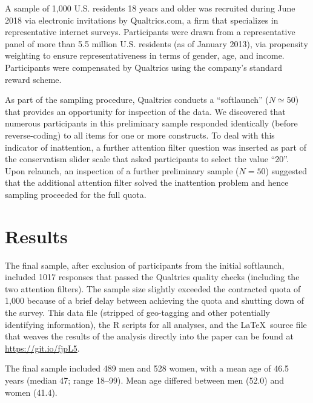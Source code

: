\documentclass[fignum,man]{apa}\usepackage[]{graphicx}\usepackage[]{color}
\begin{document}
A sample of 1,000 U.S. residents 18 years and older was recruited during June 2018
via electronic invitations by Qualtrics.com, a firm that
specializes in representative internet surveys. 
Participants were
drawn from a representative panel of more than 5.5 million
U.S. residents (as of January 2013), via propensity weighting to
ensure representativeness in terms of gender, age, and income.
Participants were compensated by Qualtrics using the company's
standard reward scheme.

As part of the sampling procedure, Qualtrics conducts a
``softlaunch'' ($N \simeq 50$) that provides an opportunity for
inspection of the data. We discovered that numerous participants 
in this preliminary sample 
responded identically (before reverse-coding)
to all items for one or more constructs. 
To deal with this indicator
of inattention, a further attention filter question was
inserted as part of the conservatism slider scale that asked
participants to select the value ``20''. Upon relaunch, 
an inspection of a further preliminary sample ($N=50$) suggested
that the additional attention filter
solved the inattention problem and hence sampling proceeded
for the full quota.

\section{Results}
The final sample, after exclusion of participants from 
the initial softlaunch, included 1017 responses that passed the Qualtrics
quality checks (including the two attention filters). The sample size
slightly exceeded the contracted quota of 1,000 because of a brief delay
between achieving the quota and shutting down of the survey.
This data file (stripped of geo-tagging and other potentially identifying 
information), 
the R scripts for all analyses, and the \LaTeX ~source file 
that weaves the results of the analysis directly into the paper can be found 
at \url{https://git.io/fjpL5}. 

The final sample included 489 men and 528 women, with a mean age of 
46.5 years
 (median 47;
range 18--99). 
Mean age differed between men (52.0) and women (41.4). 
\end{document}
